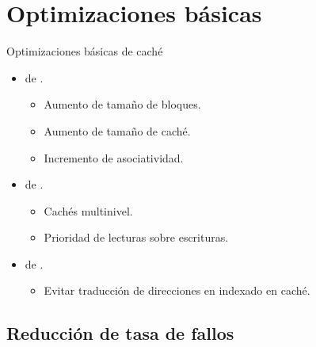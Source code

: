 \section{Optimizaciones básicas}

\begin{frame}[t]{Optimizaciones básicas de caché}
\begin{itemize}
  \item {} de .
    \begin{itemize}
      \item Aumento de tamaño de bloques.
      \item Aumento de tamaño de caché.
      \item Incremento de asociatividad.
    \end{itemize}

  \item {} de .
    \begin{itemize}
      \item Cachés multinivel.
      \item Prioridad de lecturas sobre escrituras.
    \end{itemize}

  \item {} de .
    \begin{itemize}
      \item Evitar traducción de direcciones en indexado en caché.
    \end{itemize}

\end{itemize}
\end{frame}

\subsection{Reducción de tasa de fallos}

